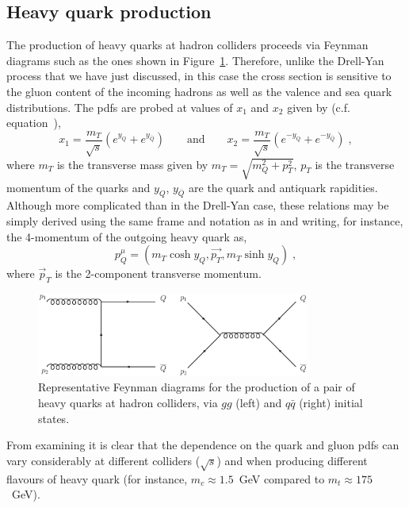 \documentclass[12pt]{iopart}
\def\beq{\begin{equation}}
\def\eeq{\end{equation}}
\begin{document}
\subsection{Heavy quark production}
\label{sec:hqrk}

The production of heavy quarks at hadron colliders proceeds via Feynman diagrams such as the ones shown in
Figure~\ref{fig:hqdiags}.
Therefore, unlike the Drell-Yan process that we have just discussed, in this case the cross section is
sensitive to the gluon content of the incoming hadrons as well as the valence and sea quark distributions.
The pdfs are probed at values of $x_1$ and $x_2$ given by (c.f. equation~),
\beq
x_1 = \frac{m_T}{\sqrt{s}} \left( e^{y_Q} + e^{y_{\bar Q}} \right) \qquad \mbox{and} \qquad
x_2 = \frac{m_T}{\sqrt{s}} \left( e^{-y_Q} + e^{-y_{\bar Q}} \right) \; ,
\label{eq:hqx1x2}
\eeq
where $m_T$ is the transverse mass given by $m_T = \sqrt{m_Q^2 + p_T^2}$, $p_T$ is the transverse momentum of
the quarks and $y_Q$, $y_{\overline Q}$ are the quark and antiquark rapidities. Although more complicated than in the
Drell-Yan case, these relations may be simply derived using the same frame and notation as in  and
writing, for instance, the 4-momentum of the outgoing heavy quark as,
\beq
\label{eq:hqmom}
p_Q^\mu = (m_T \cosh y_Q, \vec{p_T}, m_T \sinh y_Q ) \; ,
\eeq
where ${\vec p_T}$ is the 2-component transverse momentum.
%
\begin{figure}[t]
\begin{center}    
\includegraphics[width=9cm]{hqdiags.eps}    
\end{center}    
\caption{Representative Feynman diagrams for the production of a pair of heavy quarks at hadron colliders,
via $gg$ (left) and $q{\bar q}$ (right) initial states.}
\label{fig:hqdiags}
\end{figure}
%
From examining  it is clear that the dependence on the quark and gluon pdfs
can vary considerably at different colliders ($\sqrt{s}$) and when producing different flavours of heavy
quark (for instance, $m_c \approx 1.5$~GeV compared to $m_t \approx 175$~GeV).
\end{document}
